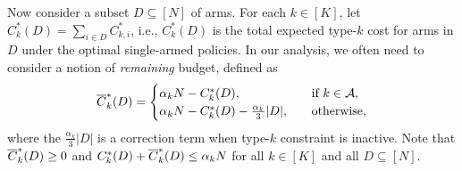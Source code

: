 \documentclass[11pt,letterpaper]{article}
\begin{document}
Now consider a subset $D\subseteq [N]$ of arms.
For each $k\in[K]$, let $C_k^*(D)=\sum_{i\in D}C_{k,i}^*$,
i.e., $C_k^*(D)$ is the total expected type-$k$ cost for arms in $D$ under the optimal single-armed policies.
In our analysis, we often need to consider a notion of \emph{remaining} budget, defined as
\begin{equation}\label{eq:remain-bud}
    \overline{C}^*_k(D)=
    \begin{cases}
        \alpha_k N-C_k^*(D),\quad&\text{if }k\in\mathcal{A},\\
        \alpha_k N-C_k^*(D)-\frac{\alpha_k}{3}|D|,\quad&\text{otherwise},
    \end{cases}
\end{equation}
where the $\frac{\alpha_k}{3}|D|$ is a correction term when type-$k$ constraint is inactive. 
Note that $\overline{C}^*_k(D)\ge 0$ and $C_k^*(D)+\overline{C}^*_k(D)\le \alpha_k N$ for all $k\in[K]$ and all $D\subseteq [N]$.
\end{document}
